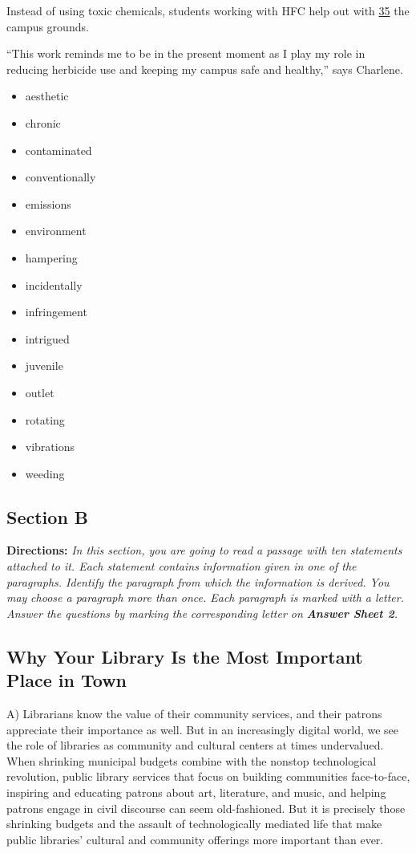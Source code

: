 \documentclass[UTF8,11pt]{ctexart}
\begin{document}
Instead of using toxic chemicals, students working with HFC help out with \uline{35} the campus grounds.


“This work reminds me to be in the present moment as I play my role in reducing herbicide use and keeping my campus safe and healthy,” says Charlene.


\begin{itemize}[leftmargin=2em,itemsep=.2em,topsep=.4em]\item[A.] aesthetic
\item[B.] chronic
\item[C.] contaminated
\item[D.] conventionally
\item[E.] emissions
\item[F.] environment
\item[G.] hampering
\item[H.] incidentally
\item[I.] infringement
\item[J.] intrigued
\item[K.] juvenile
\item[L.] outlet
\item[M.] rotating
\item[N.] vibrations
\item[O.] weeding
\end{itemize}

\subsection*{\textbf{Section B}}


\textbf{Directions:} \textit{In this section, you are going to read a passage with ten statements attached to it. Each statement contains} \textit{information given in one of the paragraphs. Identify the paragraph from which the information is derived. You may} \textit{choose a paragraph more than once. Each paragraph is marked with a letter. Answer the questions by marking the} \textit{corresponding letter on }\textbf{\textit{Answer Sheet 2}}\textit{.}


\subsection*{\textbf{Why Your Library Is the Most Important Place in Town}}


A) Librarians know the value of their community services, and their patrons appreciate their importance as well. But in an increasingly digital world, we see the role of libraries as community and cultural centers at times undervalued. When shrinking municipal budgets combine with the nonstop technological revolution, public library services that focus on building communities face-to-face, inspiring and educating patrons about art, literature, and music, and helping patrons engage in civil discourse can seem old-fashioned. But it is precisely those shrinking budgets and the assault of technologically mediated life that make public libraries’ cultural and community offerings more important than ever.
\end{document}
